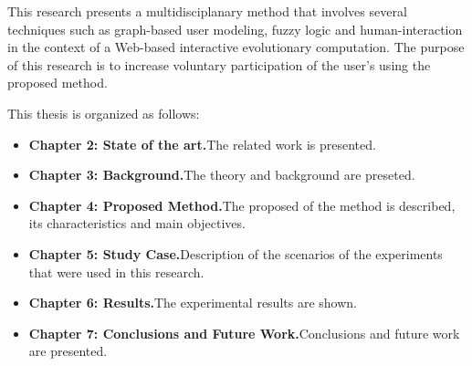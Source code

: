\par This research presents a multidisciplanary method that involves several techniques 
such as graph-based user modeling, fuzzy logic and human-interaction in the context 
of a Web-based interactive evolutionary computation. The purpose of this research 
is to increase voluntary participation of the user's  using the proposed method.

This thesis is organized as follows:
\begin{itemize}
\item  \textbf{Chapter 2: State of the art.}{The related work is presented.}
\item  \textbf{Chapter 3: Background.}{The theory and background are preseted.} 
\item  \textbf{Chapter 4: Proposed Method.}{The proposed of the method is described, its characteristics and main objectives. } 
\item  \textbf{Chapter 5: Study Case.}{Description of the scenarios of the experiments that were used in this research.}
\item  \textbf{Chapter 6: Results.}{The experimental results are shown.}
\item  \textbf{Chapter 7: Conclusions and Future Work.}{Conclusions and future work are presented.}
\end{itemize}